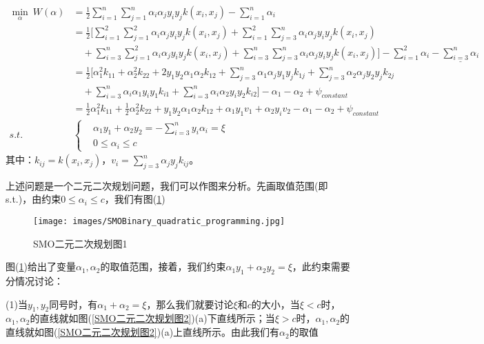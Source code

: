         \begin{align*}
        \min_\alpha \ W(\alpha)&= \frac{1}{2} \sum_{i=1}^n\sum_{j=1}^n\alpha_i\alpha_jy_iy_j k(x_i,x_j) - \sum_{i=1}^n\alpha_i\\
        &= \frac{1}{2} \bigg[ \sum_{i=1}^2\sum_{j=1}^2 \alpha_i\alpha_jy_iy_j k(x_i,x_j) +  \sum_{i=1}^2\sum_{j=3}^n \alpha_i\alpha_jy_iy_j k(x_i,x_j) \\
        & \quad + \sum_{i=3}^n\sum_{j=1}^2 \alpha_i\alpha_jy_iy_j k(x_i,x_j) +  \sum_{i=3}^n\sum_{j=3}^n \alpha_i\alpha_jy_iy_j k(x_i,x_j)\bigg] - \sum_{i=1}^2 \alpha_i - \underline{\sum_{i=3}^n\alpha_i}\\
        &=\frac{1}{2}\bigg[ \alpha_1^2k_{11}+\alpha_2^2k_{22}+2y_1y_2\alpha_1\alpha_2k_{12}+\sum_{j=3}^n\alpha_1\alpha_jy_1y_jk_{1j}+ \sum_{j=3}^n\alpha_2\alpha_jy_2y_jk_{2j}\\
        &\quad + \sum_{i=3}^n \alpha_i \alpha_1y_iy_1k_{i1}+\sum_{i=3}^n\alpha_i\alpha_2y_iy_2k_{i2}\bigg] - \alpha_1-\alpha_2+\psi_{constant}\\
        &= \frac{1}{2}\alpha_1^2k_{11}+\frac{1}{2}\alpha_2^2k_{22}+y_1y_2\alpha_1\alpha_2k_{12}+\alpha_1y_1v_1+\alpha_2y_iv_2-\alpha_1-\alpha_2+\psi_{constant}\\
        s.t.\quad &\left\{
        \begin{aligned}
        & \alpha_1y_1+\alpha_2y_2 = -\sum_{i=3}^ny_i\alpha_i = \xi\\
        & 0 \leqslant \alpha_i \leqslant c
        \end{aligned}
        \right.
        \end{align*}
        其中：$k_{ij} = k(x_i,x_j)$，$v_i = \sum_{j=3}^n\alpha_jy_jk_{ij}$。
        \par
        上述问题是一个二元二次规划问题，我们可以作图来分析。先画取值范围(即s.t.)，由约束$0 \leqslant \alpha_i \leqslant c$，我们有图(\ref{SMO二元二次规划图1})
            \begin{figure}[H]
            \centering
            \texttt{[image: images/SMOBinary\_quadratic\_programming.jpg]}
            \caption{SMO二元二次规划图1}
            \label{SMO二元二次规划图1}
            \end{figure}
        图(\ref{SMO二元二次规划图1})给出了变量$\alpha_1,\alpha_2$的取值范围，接着，我们约束$\alpha_1y_1+\alpha_2y_2 = \xi$，此约束需要分情况讨论：
        \par
        (1)当$y_1,y_2$同号时，有$\alpha_1+\alpha_2 = \xi$，那么我们就要讨论$\xi $和$c$的大小，当$\xi <c$时，$\alpha_1,\alpha_2$的直线就如图(\ref{SMO二元二次规划图2})(a)下直线所示；当$\xi > c$时，$\alpha_1,\alpha_2$的直线就如图(\ref{SMO二元二次规划图2})(a)上直线所示。由此我们有$\alpha_2$的取值
